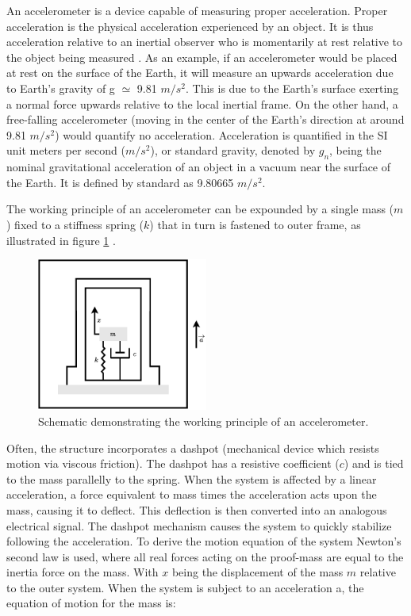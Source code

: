 An accelerometer is a device capable of measuring proper acceleration. Proper acceleration is the physical acceleration experienced by an object. It is thus acceleration relative to an inertial observer who is momentarily at rest relative to the object being measured \cite{pons2019observers}. As an example, if an accelerometer would be placed at rest on the surface of the Earth, it will measure an upwards acceleration due to Earth's gravity of g $\simeq$ 9.81 $m/s^2$. This is due to the Earth's surface exerting a normal force upwards relative to the local inertial frame. On the other hand, a free-falling accelerometer (moving in the center of the Earth's direction at around 9.81 $m/s^2$) would quantify no acceleration. Acceleration is quantified in the SI unit meters per second ($m/s^2$), or standard gravity, denoted by $g_n$, being the nominal gravitational acceleration of an object in a vacuum near the surface of the Earth. It is defined by standard as 9.80665 $m/s^2$.

The working principle of an accelerometer can be expounded by a single mass ($m$) fixed to a stiffness spring ($k$) that in turn is fastened to outer frame, as illustrated in figure \ref{fig:accelerometer_schematic} \cite{roylance1979batch}.

\begin{figure}[!h]
    \centering
    \includegraphics[width=0.5\textwidth]{figures/accelerometer.pdf}
    \caption{Schematic demonstrating the working principle of an accelerometer. \cite{roylance1979batch} }
    \label{fig:accelerometer_schematic}
\end{figure}

Often, the structure incorporates a dashpot (mechanical device which resists motion via viscous friction). The dashpot has a resistive coefficient ($c$) and is tied to the mass parallelly to the spring. When the system is affected by a linear acceleration, a force equivalent to mass times the acceleration acts upon the mass, causing it to deflect. This deflection is then converted into an analogous electrical signal. The dashpot mechanism causes the system to quickly stabilize following the acceleration. To derive the motion equation of the system Newton's second law is used, where all real forces acting on the proof-mass are equal to the inertia force on the mass. With $x$ being the displacement of the mass $m$ relative to the outer system. When the system is subject to an acceleration a, the equation of motion for the mass is:

